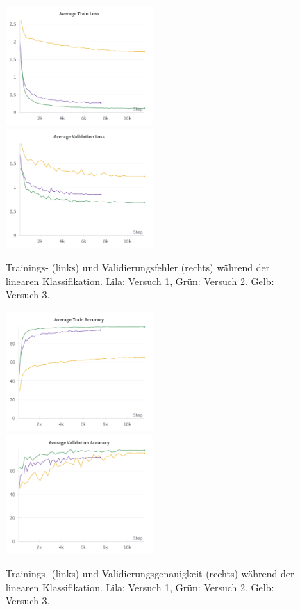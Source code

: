 \begin{figure}[]
	\centering
	\includegraphics[width=0.5\textwidth]{figure_results_supcon-lin_avg-train-loss.png}%
	\includegraphics[width=0.5\textwidth]{figure_results_supcon-lin_avg-val-loss.png}
	\caption[Trainings- (links) und Validierungsfehler (rechts) während der linearen Klassifikation.]{Trainings- (links) und Validierungsfehler (rechts) während der linearen Klassifikation. \textcolor{exp1}{Lila}: Versuch 1, \textcolor{exp2}{Grün}: Versuch 2, \textcolor{exp3}{Gelb}: Versuch 3.}
	\label{fig:supcon-lin-loss}
\end{figure}
\begin{figure}[]
	\centering
	\includegraphics[width=0.5\textwidth]{figure_results_supcon-lin_avg-train-acc.png}%
	\includegraphics[width=0.5\textwidth]{figure_results_supcon-lin_avg-val-acc.png}
	\caption[Trainings- (links) und Validierungsgenauigkeit (rechts) während der linearen Klassifikation.]{Trainings- (links) und Validierungsgenauigkeit (rechts) während der linearen Klassifikation. \textcolor{exp1}{Lila}: Versuch 1, \textcolor{exp2}{Grün}: Versuch 2, \textcolor{exp3}{Gelb}: Versuch 3.}
	\label{fig:supcon-lin-acc}
\end{figure}

